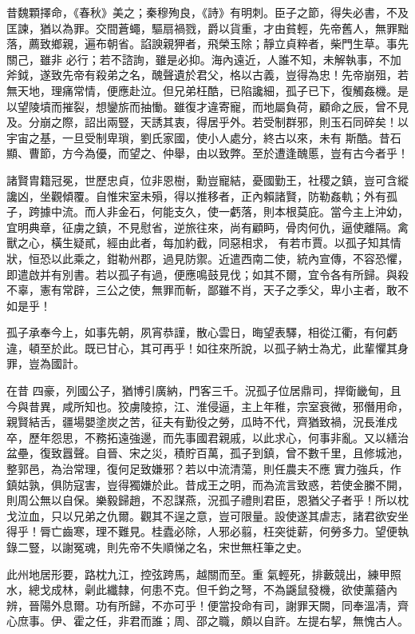 \begin{pinyinscope}
 昔魏顆擇命，《春秋》美之；秦穆殉良，《詩》有明刺。臣子之節，得失必書，不及匡諫，猶以為罪。交間蒼蠅，驅扇禍戮，爵以貨重，才由貧輕，先帝舊人，無罪黜落，薦致鄉親，遍布朝省。諂諛親狎者，飛榮玉除；靜立貞粹者，柴門生草。事先關己，雖非
 必行；若不諮詢，雖是必抑。海內遠近，人誰不知，未解執事，不加斧鉞，遂致先帝有殺弟之名，醜聲遺於君父，格以古義，豈得為忠！先帝崩殂，若無天地，理痛常情，便應赴泣。但兄弟枉酷，已陷讒細，孤子已下，復觸姦機。是以望陵墳而摧裂，想鑾旂而抽慟。雖復才違寄寵，而地屬負荷，顧命之辰，曾不見及。分崩之際，詔出兩豎，天誘其衷，得居乎外。若受制群邪，則玉石同碎矣！以宇宙之基，一旦受制卑瑣，劉氏家國，使小人處分，終古以來，未有
 斯酷。昔石顯、曹節，方今為優，而望之、仲舉，由以致弊。至於遭逢醜慝，豈有古今者乎！



 諸賢胄籍冠冕，世歷忠貞，位非恩樹，勳豈寵結，憂國勤王，社稷之鎮，豈可含縱讒凶，坐觀傾覆。自惟宋室未殞，得以推移者，正內賴諸賢，防勒姦軌；外有孤子，跨據中流。而人非金石，何能支久，使一虧落，則本根莫庇。當今主上沖幼，宜明典章，征虜之鎮，不見慰省，逆旅往來，尚有顧眄，骨肉何仇，逼使離隔。禽獸之心，橫生疑貳，經由此者，每加約截，同惡相求，
 有若市賈。以孤子知其情狀，恒恐以此乘之，鉗勒州郡，過見防禦。近遣西南二使，統內宣傳，不容恐懼，即遣啟并有別書。若以孤子有過，便應鳴鼓見伐；如其不爾，宜令各有所歸。與殺不辜，憲有常辟，三公之使，無罪而斬，鄙雖不肖，天子之季父，卑小主者，敢不如是乎！



 孤子承奉今上，如事先朝，夙宵恭謹，散心雲日，晦望表驛，相從江衢，有何虧違，頓至於此。既已甘心，其可再乎！如往來所說，以孤子納士為尤，此輩懼其身罪，豈為國計。



 在昔
 四豪，列國公子，猶博引廣納，門客三千。況孤子位居鼎司，捍衛畿甸，且今與昔異，咸所知也。狡虜陵掠，江、淮侵逼，主上年稚，宗室衰微，邪僭用命，親賢結舌，疆場嬰塗炭之苦，征夫有勤役之勞，瓜時不代，齊猶致禍，況長淮戍卒，歷年怨思，不務拓遠強邊，而先事國君親戚，以此求心，何事非亂。又以繕治盆壘，復致囂聲。自晉、宋之災，積貯百萬，孤子到鎮，曾不數千里，且修城池，整郭邑，為治常理，復何足致嫌邪？若以中流清蕩，則任農夫不應
 實力強兵，作鎮姑孰，俱防寇害，豈得獨嫌於此。昔成王之明，而為流言致惑，若使金縢不開，則周公無以自保。樂毅歸趙，不忍謀燕，況孤子禮則君臣，恩猶父子者乎！所以枕戈泣血，只以兄弟之仇爾。觀其不逞之意，豈可限量。設使遂其虐志，諸君欲安坐得乎！脣亡齒寒，理不難見。桂蠹必除，人邪必翦，枉突徙薪，何勞多力。望便執錄二豎，以謝冤魂，則先帝不失順悌之名，宋世無枉筆之史。



 此州地居形要，路枕九江，控弦跨馬，越關而至。重
 氣輕死，排藪競出，練甲照水，總戈成林，劋此纖隸，何患不克。但千鈞之弩，不為鼷鼠發機，欲使薰蕕內辨，晉陽外息爾。功有所歸，不亦可乎！便當投命有司，謝罪天闕，同奉溫凊，齊心庶事。伊、霍之任，非君而誰；周、邵之職，頗以自許。左提右挈，無愧古人。




\end{pinyinscope}
